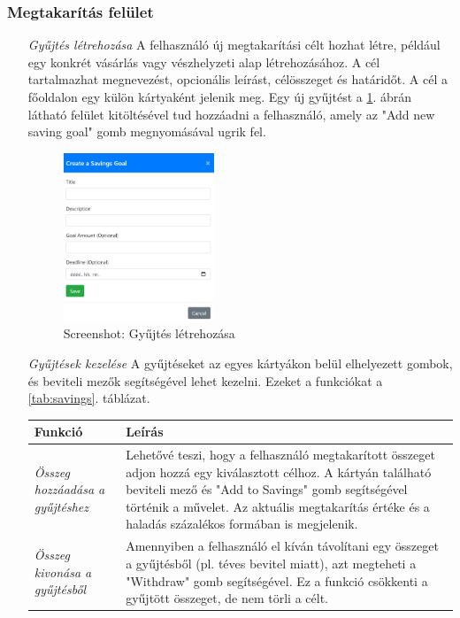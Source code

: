 \subsubsection{Megtakarítás felület}
\begin{itemize}
	\item[\emph{Gyűjtés létrehozása}] 
	A felhasználó új megtakarítási célt hozhat létre, például egy konkrét vásárlás vagy vészhelyzeti alap létrehozásához. A cél tartalmazhat megnevezést, opcionális leírást, célösszeget és határidőt. A cél a főoldalon egy külön kártyaként jelenik meg. Egy új gyűjtést a \ref{fig:addsaving}. ábrán látható felület kitöltésével tud hozzáadni a felhasználó, amely az "Add new saving goal" gomb megnyomásával ugrik fel.
	\begin{figure}[H]
		\centering
		\includegraphics[height=190px]{img/add-saving}
		\caption{Screenshot: Gyűjtés létrehozása}
		\label{fig:addsaving}
	\end{figure}
	\item[\emph{Gyűjtések kezelése}]
	A gyűjtéseket az egyes kártyákon belül elhelyezett gombok, és beviteli mezők segítségével lehet kezelni. Ezeket a funkciókat a \ref{tab:savings}. táblázat.
	\begin{table}[H]
		\centering
		\begin{tabular}{ | m{} | m{} | }
			\hline
			\textbf{Funkció} & \textbf{Leírás} \\
			\hline \hline
			
			\emph{Összeg hozzáadása a gyűjtéshez} &
			Lehetővé teszi, hogy a felhasználó megtakarított összeget adjon hozzá egy kiválasztott célhoz. A kártyán található beviteli mező és "Add to Savings" gomb segítségével történik a művelet. Az aktuális megtakarítás értéke és a haladás százalékos formában is megjelenik. \\
			
			\hline
			
			\emph{Összeg kivonása a gyűjtésből} &
			Amennyiben a felhasználó el kíván távolítani egy összeget a gyűjtésből (pl. téves bevitel miatt), azt megteheti a "Withdraw" gomb segítségével. Ez a funkció csökkenti a gyűjtött összeget, de nem törli a célt. \\
			

\end{tabular}
\end{table}
\end{itemize}
